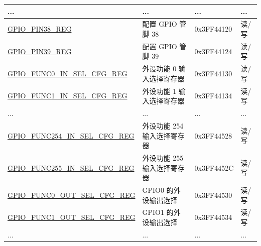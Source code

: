 \begin{longtable}{ | p{5.5cm} | p{7.5cm} | p{2cm} | p{1cm} | }
... & ... & ...&... \\ \hline
\hyperref[regdesc:GPIOPINnREG]{GPIO\_PIN38\_REG} & 配置 GPIO 管脚 38 & 0x3FF44120 & 读/写 \\ \hline
\hyperref[regdesc:GPIOPINnREG]{GPIO\_PIN39\_REG} & 配置 GPIO 管脚 39 & 0x3FF44124 & 读/写 \\ \hline
\hyperref[regdesc:GPIOFUNCnINSELCFGREG]{GPIO\_FUNC0\_IN\_SEL\_CFG\_REG} & 外设功能 0 输入选择寄存器 & 0x3FF44130 &读/写 \\ \hline
\hyperref[regdesc:GPIOFUNCnINSELCFGREG]{GPIO\_FUNC1\_IN\_SEL\_CFG\_REG} & 外设功能 1 输入选择寄存器 & 0x3FF44134 & 读/写 \\ \hline
... & ... &... &... \\ \hline
\hyperref[regdesc:GPIOFUNCnINSELCFGREG]{GPIO\_FUNC254\_IN\_SEL\_CFG\_REG} & 外设功能 254 输入选择寄存器 & 0x3FF44528 & 读/写 \\ \hline
\hyperref[regdesc:GPIOFUNCnINSELCFGREG]{GPIO\_FUNC255\_IN\_SEL\_CFG\_REG} & 外设功能 255 输入选择寄存器 & 0x3FF4452C & 读/写 \\ \hline
\hyperref[regdesc:GPIOFUNCnOUTSELCFGREG]{GPIO\_FUNC0\_OUT\_SEL\_CFG\_REG} & GPIO0 的外设输出选择 & 0x3FF44530 & 读/写 \\ \hline
\hyperref[regdesc:GPIOFUNCnOUTSELCFGREG]{GPIO\_FUNC1\_OUT\_SEL\_CFG\_REG} & GPIO1 的外设输出选择 & 0x3FF44534 & 读/写 \\ \hline
... & ... &... &... \\ \hline
\end{longtable}

